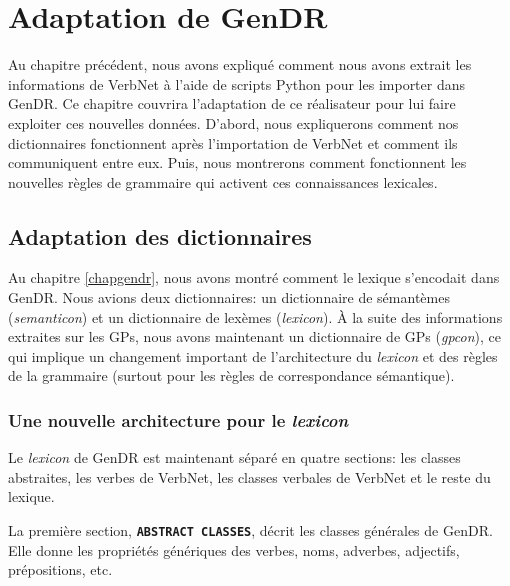
\chapter{Adaptation de GenDR}\label{ch:implementation}

Au chapitre précédent, nous avons expliqué comment nous avons extrait les informations de VerbNet à l'aide de scripts Python pour les importer dans GenDR. Ce chapitre couvrira l'adaptation de ce réalisateur pour lui faire exploiter ces nouvelles données. D'abord, nous expliquerons comment nos dictionnaires fonctionnent après l'importation de VerbNet et comment ils communiquent entre eux. Puis, nous montrerons comment fonctionnent les nouvelles règles de grammaire qui activent ces connaissances lexicales.

\section{Adaptation des dictionnaires}

Au chapitre \ref{chapgendr}, nous avons montré comment le lexique s'encodait dans GenDR. Nous avions deux dictionnaires: un dictionnaire de sémantèmes (\emph{semanticon}) et un dictionnaire de lexèmes (\emph{lexicon}). À la suite des informations extraites sur les \acp{GP}, nous avons maintenant un dictionnaire de \acp{GP} (\emph{gpcon}), ce qui implique un changement important de l'architecture du \emph{lexicon} et des règles de la grammaire (surtout pour les règles de correspondance sémantique).


\subsection{Une nouvelle architecture pour le \emph{lexicon}}

Le \emph{lexicon} de GenDR est maintenant séparé en quatre sections: les classes abstraites, les verbes de VerbNet, les classes verbales de VerbNet et le reste du lexique.

La première section, \textbf{\texttt{ABSTRACT CLASSES}}, décrit les classes générales de GenDR. Elle donne les propriétés génériques des verbes, noms, adverbes, adjectifs, prépositions, etc.

